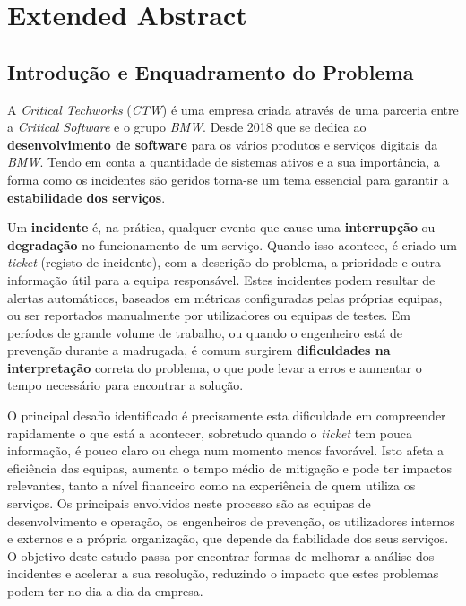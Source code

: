 
\chapter{Extended Abstract} %

\section{Introdução e Enquadramento do Problema}
	A \textit{Critical Techworks} (\textit{CTW}) é uma empresa criada através de uma parceria entre a \textit{Critical Software} e o grupo \textit{BMW}. Desde 2018 que se dedica ao \textbf{desenvolvimento de software} para os vários produtos e serviços digitais da \textit{BMW}. Tendo em conta a quantidade de sistemas ativos e a sua importância, a forma como os incidentes são geridos torna-se um tema essencial para garantir a \textbf{estabilidade dos serviços}.
	
	Um \textbf{incidente} é, na prática, qualquer evento que cause uma \textbf{interrupção} ou  \textbf{degradação} no funcionamento de um serviço. Quando isso acontece, é criado um \textit{ticket} (registo de incidente), com a descrição do problema, a prioridade e outra informação útil para a equipa responsável. Estes incidentes podem resultar de alertas automáticos, baseados em métricas configuradas pelas próprias equipas, ou ser reportados manualmente por utilizadores ou equipas de testes. Em períodos de grande volume de trabalho, ou quando o engenheiro está de prevenção durante a madrugada, é comum surgirem \textbf{dificuldades na interpretação} correta do problema, o que pode levar a erros e aumentar o tempo necessário para encontrar a solução.
	
	O principal desafio identificado é precisamente esta dificuldade em compreender rapidamente o que está a acontecer, sobretudo quando o \textit{ticket} tem pouca informação, é pouco claro ou chega num momento menos favorável. Isto afeta a eficiência das equipas, aumenta o tempo médio de mitigação e pode ter impactos relevantes, tanto a nível financeiro como na experiência de quem utiliza os serviços. Os principais envolvidos neste processo são as equipas de desenvolvimento e operação, os engenheiros de prevenção, os utilizadores internos e externos e a própria organização, que depende da fiabilidade dos seus serviços. O objetivo deste estudo passa por encontrar formas de melhorar a análise dos incidentes e acelerar a sua resolução, reduzindo o impacto que estes problemas podem ter no dia-a-dia da empresa.


